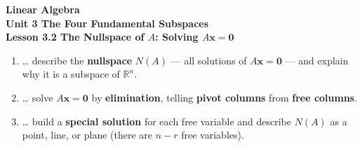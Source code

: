 \documentclass[10pt]{article}
\begin{document}
\vspace{-0.8in}

\begin{center}
  {\color{white}\textbf{\LARGE Linear Algebra}}\\[4pt]
  {\color{blushmid}\large\textbf{Unit 3 \quad The Four Fundamental Subspaces}}\\[6pt]
  {\color{white}\textbf{\large Lesson 3.2 \quad The Nullspace of $A$: Solving $A\mathbf{x}=\mathbf{0}$}}
\end{center}

\vspace{0.22in}
\namedateperiod
\vspace{0.18in}

\begin{learningtargetbox}
\small
\begin{enumerate}[leftmargin=1.5em, itemsep=5pt]
  \item \ldots{} describe the \textbf{nullspace} $N(A)$ --- all solutions of $A\mathbf{x}=\mathbf{0}$ --- and explain why it is a subspace of $\mathbb{R}^n$.
  \item \ldots{} solve $A\mathbf{x}=\mathbf{0}$ by \textbf{elimination}, telling \textbf{pivot columns} from \textbf{free columns}.
  \item \ldots{} build a \textbf{special solution} for each free variable and describe $N(A)$ as a point, line, or plane (there are $n-r$ free variables).
\end{enumerate}
\end{learningtargetbox}

\vspace{0.14in}
\end{document}

